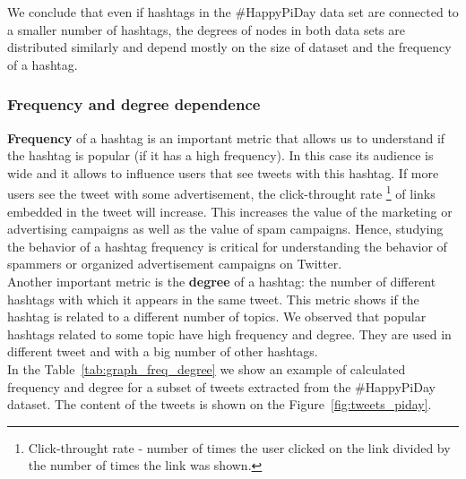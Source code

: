 \documentclass[journal, a4paper, 12pt]{article}
\begin{document}
We conclude that even if hashtags in the \#HappyPiDay data set are connected to a smaller number of hashtags, the degrees of nodes in both data sets are distributed similarly and depend mostly on the size of dataset and the frequency of a hashtag. \\

\subsubsection{Frequency and degree dependence}
\textbf{Frequency} of a hashtag is an important metric that allows us to understand if the hashtag is popular (if it has a high frequency). In this case its audience is wide and it allows to influence users that see tweets with this hashtag. If more users see the tweet with some advertisement, the click-throught rate \footnote{Click-throught rate - number of times the user clicked on the link divided by the number of times the link was shown.} of links embedded in the tweet will increase. This increases the value of the marketing or advertising campaigns as well as the value of spam campaigns. Hence, studying the behavior of a hashtag frequency is critical for understanding the behavior of spammers or organized advertisement campaigns on Twitter.\\

Another important metric is the \textbf{degree} of a hashtag: the number of different hashtags with which it appears in the same tweet. This metric shows if the hashtag is related to a different number of topics. We observed that popular hashtags related to some topic have high frequency and degree. They are used in different tweet and with a big number of other hashtags. \\

In the Table~\ref{tab:graph_freq_degree} we show an example of calculated frequency and degree for a subset of tweets extracted from the \#HappyPiDay dataset. The content of the tweets is shown on the Figure~\ref{fig:tweets_piday}. 
\end{document}
